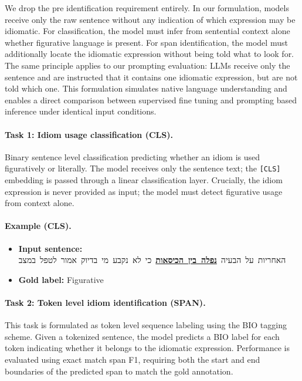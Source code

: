\documentclass[11pt, a4paper]{report}
\begin{document}
We drop the pre identification requirement entirely. In our formulation, models receive only the raw sentence without any indication of which expression may be idiomatic. For classification, the model must infer from sentential context alone whether figurative language is present. For span identification, the model must additionally locate the idiomatic expression without being told what to look for. The same principle applies to our prompting evaluation: LLMs receive only the sentence and are instructed that it contains one idiomatic expression, but are not told which one. This formulation simulates native language understanding and enables a direct comparison between supervised fine tuning and prompting based inference under identical input conditions.

\paragraph{Task 1: Idiom usage classification (CLS).}
Binary sentence level classification predicting whether an idiom is used figuratively or literally. The model receives only the sentence text; the \texttt{[CLS]} embedding is passed through a linear classification layer. Crucially, the idiom expression is never provided as input; the model must detect figurative usage from context alone.

\paragraph{Example (CLS).}
\begin{itemize}[noitemsep,topsep=0pt]
    \item \textbf{Input sentence:}
    \mbox{\beginR\foreignlanguage{hebrew}{האחריות על הבעיה \textbf{\underline{נפלה בין הכיסאות}} כי לא נקבע מי בדיוק אמור לטפל במצב}\endR}
    \item \textbf{Gold label:} Figurative
\end{itemize}


\paragraph{Task 2: Token level idiom identification (SPAN).}
This task is formulated as token level sequence labeling using the BIO
tagging scheme. Given a tokenized sentence, the model predicts a BIO label
for each token indicating whether it belongs to the idiomatic expression.
Performance is evaluated using exact match span F1, requiring both the
start and end boundaries of the predicted span to match the gold annotation.
\end{document}

